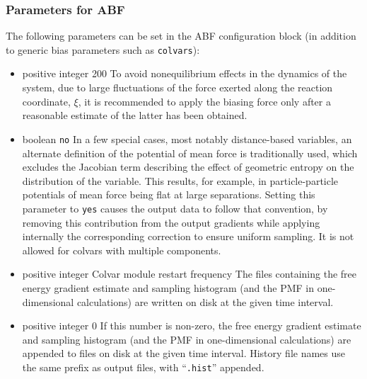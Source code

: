 \subsubsection*{Parameters for ABF}

The following parameters can be set in the ABF configuration block
(in addition to generic bias parameters such as \texttt{colvars}):

\begin{itemize}
\item {}
  {positive integer}
  {200}
  {To avoid nonequilibrium effects in the dynamics of the system, due to large
    fluctuations of the force exerted along the reaction coordinate, $\xi$, it
    is recommended to apply the biasing force only after a reasonable estimate
    of the latter has been obtained.}

\item {}
  {boolean}
  {\texttt{no}}
  {In a few special cases, most notably distance-based variables, an alternate definition of
    the potential of mean force is traditionally used, which excludes the Jacobian
    term describing the effect of geometric entropy on the distribution of the variable.
    This results, for example, in particle-particle potentials of mean force being flat
    at large separations.
    Setting this parameter to \texttt{yes} causes the output data to follow that convention,
    by removing this contribution from the output gradients while
    applying internally the corresponding correction to ensure uniform sampling.
    It is not allowed for colvars with multiple components.}

\item {}
  {positive integer}
  {Colvar module restart frequency}
  {The files containing the free energy gradient estimate and sampling histogram
    (and the PMF in one-dimensional calculations) are written on disk at the given
    time interval.}

\item {}
  {positive integer}
  {0}
  {If this number is non-zero, the free energy gradient estimate and sampling histogram
    (and the PMF in one-dimensional calculations) are appended to files on disk at
    the given time interval. History file names use the same prefix as output files, with
    ``\texttt{.hist}'' appended.}


\end{itemize}
